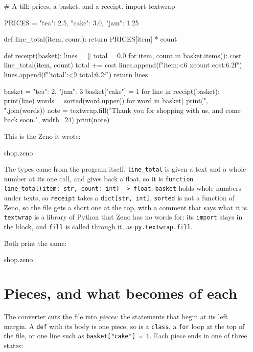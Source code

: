 \begin{zeno}[file=shop.py, dir=convert, show=no, cmd=zeno convert {file}]
# A till: prices, a basket, and a receipt.
import textwrap

PRICES = {"tea": 2.5, "cake": 3.0, "jam": 1.25}


def line_total(item, count):
    return PRICES[item] * count


def receipt(basket):
    lines = []
    total = 0.0
    for item, count in basket.items():
        cost = line_total(item, count)
        total += cost
        lines.append(f"{item:<6} x{count}  {cost:6.2f}")
    lines.append(f"{'total':<9} {total:6.2f}")
    return lines


basket = {"tea": 2, "jam": 3}
basket["cake"] = 1
for line in receipt(basket):
    print(line)
words = sorted(word.upper() for word in basket)
print(", ".join(words))
note = textwrap.fill("Thank you for shopping with us, and come back soon.", width=24)
print(note)
\end{zeno}

This is the Zeno it wrote:

\begin{zeno}[file=read.txt, dir=convert, show=no, cmd=cat shop.zeno]
shop.zeno
\end{zeno}

The types came from the program itself. \verb|line_total| is given a
text and a whole number at its one call, and gives back a float, so it
is \verb|function line_total(item: str, count: int) -> float|.
\verb|basket| holds whole numbers under texts, so \verb|receipt| takes
a \verb|dict[str, int]|. \verb|sorted| is not a function of Zeno, so
the file gets a short one at the top, with a comment that says what it
is. \verb|textwrap| is a library of Python that Zeno has no words for:
its \verb|import| stays in the block, and \verb|fill| is called
through it, as \verb|py.textwrap.fill|.

Both print the same:

\begin{zeno}[file=read.txt, dir=convert, show=no, cmd=zeno run shop.zeno ;; python3 shop.py]
shop.zeno
\end{zeno}

\section{Pieces, and what becomes of each}

The converter cuts the file into \emph{pieces}: the statements that
begin at its left margin. A \verb|def| with its body is one piece, so
is a \verb|class|, a \verb|for| loop at the top of the file, or one
line such as \verb|basket["cake"] = 1|. Each piece ends in one of
three states:

